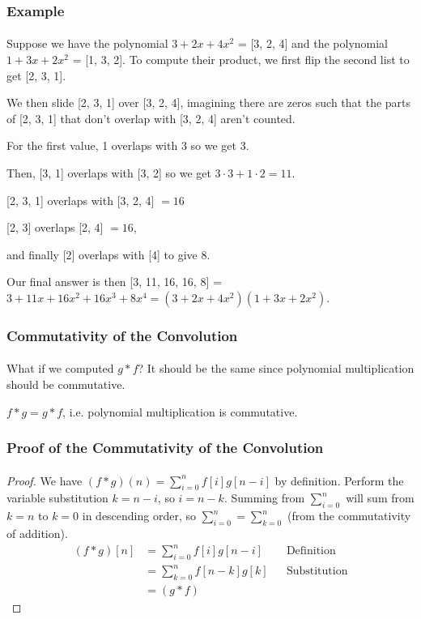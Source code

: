 \documentclass{beamer}                             %
\begin{document}
\begin{frame}
\frametitle{Example}
\framesubtitle{}
Suppose we have the polynomial \( 3 + 2x + 4x^2 \) = [3, 2, 4]
and the polynomial \( 1 + 3x + 2x^2 \) = [1, 3, 2]. To compute their
product, we first flip the second list to get [2, 3, 1]. \pause

We then slide [2, 3, 1] over [3, 2, 4],
imagining there are zeros such that the parts of [2, 3, 1]
that don't overlap with [3, 2, 4] aren't counted. \pause

For the first value, 1 overlaps with 3 so we get 3. \pause

Then, [3, 1] overlaps with [3, 2] so we get \( 3 \cdot 3 + 1 \cdot 2 = 11 \).
\pause

[2, 3, 1] overlaps with [3, 2, 4] \( = 16 \) \pause

[2, 3] overlaps [2, 4] \( = 16 \), \pause

and finally [2] overlaps with [4] to give 8. \pause

Our final answer is then [3, 11, 16, 16, 8] = \( 3 + 11x + 16x^2 + 16x^3 + 8x^4
= (3 + 2x + 4x^2)(1 + 3x + 2x^2) \).
\end{frame}

\begin{frame}
\frametitle{Commutativity of the Convolution}
\framesubtitle{}
What if we computed \( g * f \)? It should be the same since
polynomial multiplication should be commutative.
\begin{theorem}
    \( f * g = g * f \), i.e. polynomial multiplication is commutative.
\end{theorem}
\end{frame}

\begin{frame}
\frametitle{Proof of the Commutativity of the Convolution}
\framesubtitle{}
\begin{proof}
    We have \( (f * g)(n) = \sum^n_{i = 0} f[i]g[n - i] \) by definition.
Perform the variable substitution \( k = n - i \), so \( i = n - k \).
Summing from \( \sum^n_{i = 0} \) will sum from \( k = n \) to \( k = 0 \)
in descending order, so \( \sum^n_{i = 0} = \sum^n_{k = 0} \)
(from the commutativity of addition).
\begin{align*}
    (f * g)[n] &= \sum^n_{i = 0} f[i]g[n - i] && \text{Definition} \\
               &= \sum^n_{k = 0} f[n - k]g[k] && \text{Substitution} \\
               &= (g * f)
\end{align*}
\end{proof}
\end{frame}
\end{document}
